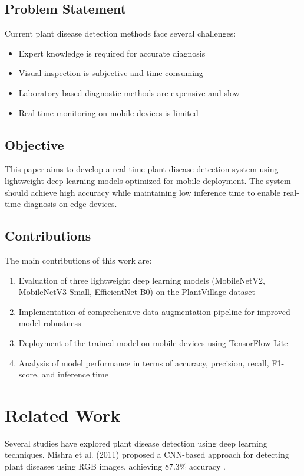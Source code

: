 \documentclass[conference]{IEEEtran}
\begin{document}
\subsection{Problem Statement}
Current plant disease detection methods face several challenges:
\begin{itemize}
\item Expert knowledge is required for accurate diagnosis
\item Visual inspection is subjective and time-consuming
\item Laboratory-based diagnostic methods are expensive and slow
\item Real-time monitoring on mobile devices is limited
\end{itemize}

\subsection{Objective}
This paper aims to develop a real-time plant disease detection system using lightweight deep learning models optimized for mobile deployment. The system should achieve high accuracy while maintaining low inference time to enable real-time diagnosis on edge devices.

\subsection{Contributions}
The main contributions of this work are:
\begin{enumerate}
\item Evaluation of three lightweight deep learning models (MobileNetV2, MobileNetV3-Small, EfficientNet-B0) on the PlantVillage dataset
\item Implementation of comprehensive data augmentation pipeline for improved model robustness
\item Deployment of the trained model on mobile devices using TensorFlow Lite
\item Analysis of model performance in terms of accuracy, precision, recall, F1-score, and inference time
\end{enumerate}

\section{Related Work}
Several studies have explored plant disease detection using deep learning techniques. Mishra et al. (2011) proposed a CNN-based approach for detecting plant diseases using RGB images, achieving 87.3\% accuracy \cite{mishra2011}. 
\end{document}
